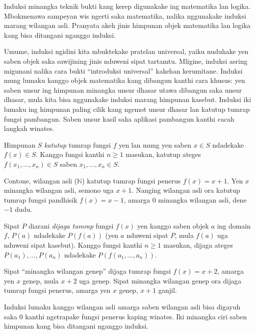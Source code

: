 \documentclass[../../../include/open-logic-section]{subfiles}
\begin{document}


\begin{explain}
Induksi minangka teknik bukti kang kerep digunakake ing matematika lan
logika. Mbokmenawa sampeyan wis ngerti saka matematika, nalika
nggunakake induksi marang wilangan asli. Pranyata akeh jinis
himpunan objek matematika lan logika kang bisa ditangani nganggo induksi.

Umume, induksi ngidini kita mbuktekake pratelan universal, yaiku
nuduhake yen saben objek saka sawijining jinis nduweni sipat tartamtu.
Mligine, induksi asring migunani nalika cara bukti ``introduksi universal''
kakehan kerumitane. Induksi mung lumaku kanggo objek matematika kang
dibangun kanthi cara khusus: yen saben unsur ing himpunan minangka unsur
dhasar utawa dibangun saka unsur dhasar, mula kita bisa nggunakake
induksi marang himpunan kasebut.
Induksi iki lumaku ing himpunan paling cilik kang ngemot unsur
dhasar lan katutup tumrap fungsi pambangun. Saben unsur kasil
saka aplikasi pambangun kanthi cacah langkah winates.
\end{explain}

\begin{defn}
Himpunan $S$ \emph{katutup} tumrap fungsi $f$ yen lan mung yen
saben $x \in S$ ndadekake $f(x) \in S$.
Kanggo fungsi kanthi $n \ge 1$ masukan, katutup ateges
$f(x_1,\ldots,x_n) \in S$ saben $x_1,\ldots,x_n \in S$.
\end{defn}

\begin{explain}
Contone, wilangan asli ($\mathbb{N}$) katutup tumrap fungsi penerus
$f(x) = x+1$. Yen $x$ minangka wilangan asli, semono uga $x+1$.
Nanging wilangan asli ora katutup tumrap fungsi pandhisik
$f(x) = x-1$, amarga $0$ minangka wilangan asli, dene $-1$ dudu.
\end{explain}

\begin{defn}
Sipat $P$ diarani \emph{dijaga tumrap} fungsi $f(x)$ yen kanggo
saben objek $a$ ing domain $f$, $P(a)$ ndadekake $P(f(a))$
(yen $a$ nduweni sipat $P$, mula $f(a)$ uga nduweni sipat kasebut).
Kanggo fungsi kanthi $n \ge 1$ masukan, dijaga ateges
$P(a_1),\ldots,P(a_n)$ ndadekake $P(f(a_1,\ldots,a_n))$.
\end{defn}

\begin{explain}
Sipat ``minangka wilangan genep'' dijaga tumrap fungsi $f(x) = x+2$,
amarga yen $x$ genep, mula $x+2$ uga genep. Sipat minangka wilangan
genep ora dijaga tumrap fungsi penerus, amarga yen $x$ genep,
$x+1$ ganjil.

Induksi lumaku kanggo wilangan asli amarga saben wilangan asli bisa
digayuh saka 0 kanthi ngetrapake fungsi penerus kaping winates.
Iki minangka ciri saben himpunan kang bisa ditangani nganggo induksi.
\end{explain}
\end{document}
